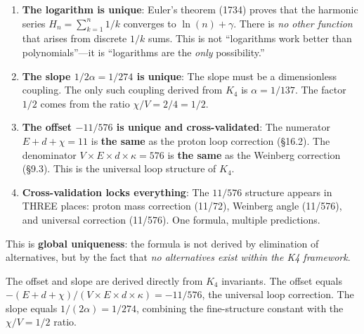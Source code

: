 \documentclass[11pt,a4paper]{book}
\begin{document}
\begin{enumerate}
\item \textbf{The logarithm is unique}: Euler's theorem (1734) proves that the harmonic series $H_n = \sum_{k=1}^n 1/k$ converges to $\ln(n) + \gamma$. There is \emph{no other function} that arises from discrete $1/k$ sums. This is not ``logarithms work better than polynomials''---it is ``logarithms are the \emph{only} possibility.''

\item \textbf{The slope $1/2\alpha = 1/274$ is unique}: The slope must be a dimensionless coupling. The only such coupling derived from $K_4$ is $\alpha = 1/137$. The factor $1/2$ comes from the ratio $\chi/V = 2/4 = 1/2$.

\item \textbf{The offset $-11/576$ is unique and cross-validated}: The numerator $E + d + \chi = 11$ is \textbf{the same} as the proton loop correction (\S 16.2). The denominator $V \times E \times d \times \kappa = 576$ is \textbf{the same} as the Weinberg correction (\S 9.3). This is the universal loop structure of $K_4$.

\item \textbf{Cross-validation locks everything}: The $11/576$ structure appears in THREE places: proton mass correction (11/72), Weinberg angle (11/576), and universal correction (11/576). One formula, multiple predictions.
\end{enumerate}

This is \textbf{global uniqueness}: the formula is not derived by elimination of alternatives, but by the fact that \emph{no alternatives exist within the K4 framework}.

The offset and slope are derived directly from $K_4$ invariants. The offset equals $-(E + d + \chi)/(V \times E \times d \times \kappa) = -11/576$, the universal loop correction. The slope equals $1/(2\alpha) = 1/274$, combining the fine-structure constant with the $\chi/V = 1/2$ ratio.
\end{document}
